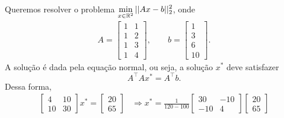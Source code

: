 
\begin{questions}

\begin{solution}
	Queremos resolver o problema
    $\displaystyle\min_{x\in{\mathbb R}^2}||Ax-b||_2^2$,
    onde
    \begin{align*}
        A = 
        \begin{bmatrix}
            1   & 1 \\
            1   & 2 \\
            1   & 3 \\
            1   & 4
        \end{bmatrix},
        \qquad
        b = 
        \begin{bmatrix}
            1\\ 3\\ 6\\ 10
        \end{bmatrix}.
    \end{align*}
    A solução é dada pela equação normal, ou seja, a solução $x^*$ deve satisfazer
    \[A^\top A x^* = A^\top b.\]
    Dessa forma,
    \begin{align*}
        \begin{bmatrix}
            4   &   10  \\
            10  &   30
        \end{bmatrix}
        x^* =
        \begin{bmatrix}
            20\\ 65
        \end{bmatrix}
        &\Rightarrow
        x^* = \frac{1}{120-100}
        \begin{bmatrix}
            30 & -10 \\
            -10 & 4
        \end{bmatrix}
        \begin{bmatrix}
            20 \\ 65

\end{bmatrix}
\end{align*}
\end{solution}
\end{questions}
